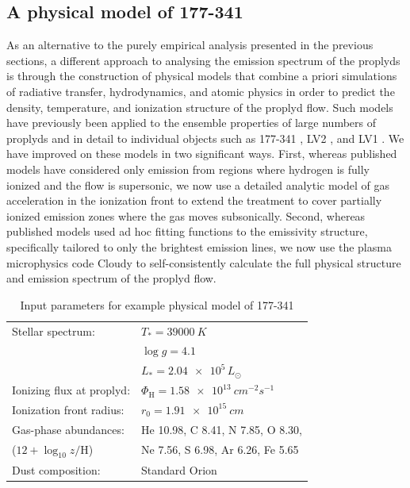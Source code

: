 \documentclass[useAMS,usenatbib]{mn2e}
\begin{document}
\addtocounter{section}{6}
\addtocounter{subsection}{2}
\addtocounter{table}{5}
\addtocounter{figure}{9}


\subsection{A physical model of 177-341}
As an alternative to the purely empirical analysis presented in the previous sections, a different approach to analysing the emission spectrum of the proplyds is through the construction of physical models that combine a priori simulations of radiative transfer, hydrodynamics, and atomic physics in order to predict the density, temperature, and ionization structure of the proplyd flow.  
Such models have previously been applied to the ensemble properties of large numbers of proplyds \citep*{1998ApJ...499..758J, 1998AJ....116..322H} and in detail to individual objects such as 177-341 \citep{1999AJ....118.2350H}, LV2 \citep{2002ApJ...566..315H}, and LV1 \citep{2002ApJ...570..222G}. 
We have improved on these models in two significant ways.
First, whereas published models have considered only emission from regions where hydrogen is fully ionized and the flow is supersonic, we now use a detailed analytic model of gas acceleration in the ionization front \citep{2005ApJ...621..328H} to extend the treatment to cover partially ionized emission zones where the gas moves subsonically. 
Second, whereas published models used ad hoc fitting functions to the emissivity structure, specifically tailored to only the brightest emission lines, we now use the plasma microphysics code Cloudy \citep{1998PASP..110..761F} to self-consistently calculate the full physical structure and emission spectrum of the proplyd flow. 


\begin{table}
  \centering
  \caption{Input parameters for example physical model of 177-341} 
  \begin{tabular}{@{\,}ll@{\,}}\hline
    Stellar spectrum:& 
    \(T_* = \SI{39000}{K}\)\\
    \citep{2006AandA...448..351S} & \(\log g = 4.1\)\\
    & \(L_* = \num{2.04e5}\,L_\odot\)\\
    Ionizing flux at proplyd:& 
    \(\Phi_{\mathrm{H}} = \SI{1.58e13}{cm^{-2} s^{-1}}\)
    \\
    Ionization front radius:& 
    \(r_0 = \SI{1.91e15}{cm}\)
    \\
    Gas-phase abundances: & 
    He 10.98, C 8.41, N 7.85, O 8.30, \\
    (\(12 + \log_{10} z/\mathrm{H}\)) & Ne 7.56, S 6.98, Ar 6.26, Fe 5.65
    \\
    Dust composition: & Standard Orion \citep{1991ApJ...374..580B}\\
    \hline
  \end{tabular}
  \label{tab:model:pars}
\end{table}
\end{document}

